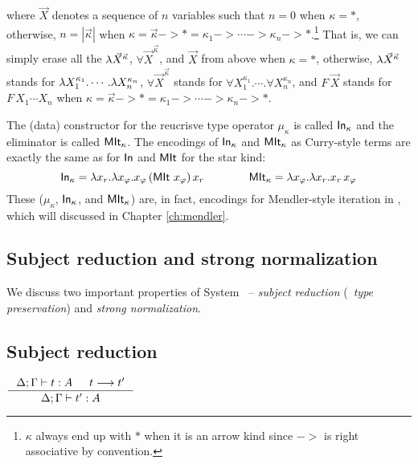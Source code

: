 where $\vec{X}$ denotes a sequence of $n$ variables
such that $n=0$ when $\kappa = *$, otherwise, $n = |\vec{\kappa}|$ when
$\kappa = \vec{\kappa} -> * = \kappa_1 -> \cdots -> \kappa_n -> *$.\footnote{
	$\kappa$ always end up with $*$ when it is an arrow kind
	since $->$ is right associative by convention.}
That is, we can simply erase all the $\lambda \vec{X}^{\vec{\kappa}}$,
$\forall \vec{X}^{\vec{\kappa}}$, and $\vec{X}$ from above when
$\kappa = *$, otherwise, $\lambda \vec{X}^{\vec{\kappa}}$ stands for
$\lambda X_1^{\kappa_1}.\cdots.\lambda X_n^{\kappa_n}$,
$\forall \vec{X}^{\vec{\kappa}}$ stands for
$\forall X_1^{\kappa_1}.\cdots.\forall X_n^{\kappa_n}$,
and $F\,\vec{X}$ stands for $F\,X_1\cdots X_n$
when $\kappa = \vec{\kappa} -> * = \kappa_1 -> \cdots -> \kappa_n -> *$.

The (data) constructor for the reucrisve type operator $\mu_\kappa$ is
called $\mathsf{In}_\kappa$ and the eliminator is called $\mathsf{MIt}_\kappa$.
The encodings of $\mathsf{In}_\kappa$ and $\mathsf{MIt}_\kappa$ as Curry-style terms are
exactly the same as for $\mathsf{In}$ and $\mathsf{MIt}$ for the star kind:
\[ \mathsf{In}_\kappa = \lambda x_r. \lambda x_\varphi.x_\varphi\,(\mathsf{MIt}~x_\varphi)\,x_r
\qquad\qquad \mathsf{MIt}_\kappa = \lambda x_\varphi.\lambda x_r.x_r\,x_\varphi \]
These ($\mu_\kappa$, $\mathsf{In}_\kappa$, and $\mathsf{MIt}_\kappa$) are, in fact,
encodings for Mendler-style iteration in \Fw, which will discussed in
Chapter \ref{ch:mendler}. %



\subsection{Subject reduction and strong normalization}\label{sec:fw:srsn}
We discuss two important properties of System \Fw\ --
\emph{subject reduction} (\aka\ \emph{type preservation})
and \emph{strong normalization}.

\subsection*{Subject reduction}
\begin{theorem}
$\inference{\Delta;\Gamma |- t : A  & t --> t'}{\Delta;\Gamma |- t' : A}$
\end{theorem}


